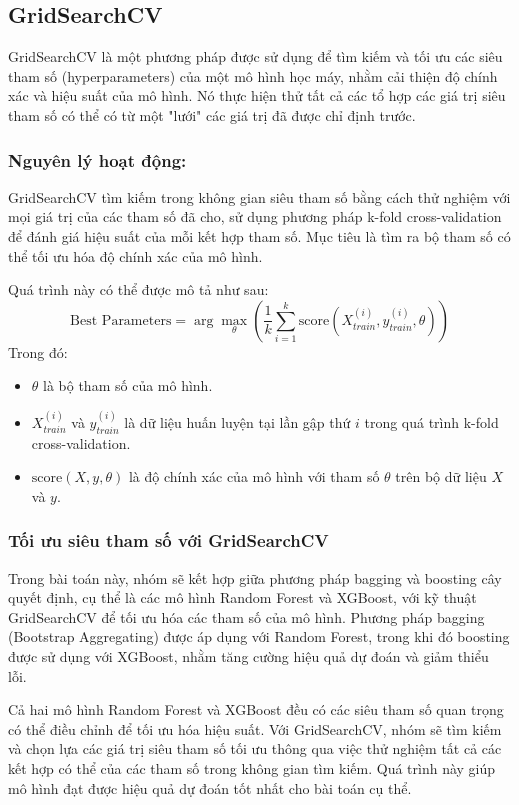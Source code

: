 \subsection{GridSearchCV} 
GridSearchCV là một phương pháp được sử dụng để tìm kiếm và tối ưu các siêu tham số (hyperparameters) của một mô hình học máy, nhằm cải thiện độ chính xác và hiệu suất của mô hình. Nó thực hiện thử tất cả các tổ hợp các giá trị siêu tham số có thể có từ một "lưới" các giá trị đã được chỉ định trước.

\subsubsection*{Nguyên lý hoạt động:}
GridSearchCV tìm kiếm trong không gian siêu tham số bằng cách thử nghiệm với mọi giá trị của các tham số đã cho, sử dụng phương pháp k-fold cross-validation để đánh giá hiệu suất của mỗi kết hợp tham số. Mục tiêu là tìm ra bộ tham số có thể tối ưu hóa độ chính xác của mô hình.

Quá trình này có thể được mô tả như sau:
\[
\text{Best Parameters} = \arg \max_{\theta} \left( \frac{1}{k} \sum_{i=1}^{k} \text{score}(X_{train}^{(i)}, y_{train}^{(i)}, \theta) \right)
\]
Trong đó:
\begin{itemize}
	\item \( \theta \) là bộ tham số của mô hình.
	\item \( X_{train}^{(i)} \) và \( y_{train}^{(i)} \) là dữ liệu huấn luyện tại lần gập thứ \(i\) trong quá trình k-fold cross-validation.
	\item \(\text{score}(X, y, \theta)\) là độ chính xác của mô hình với tham số \(\theta\) trên bộ dữ liệu \(X\) và \(y\).
\end{itemize}
\subsubsection*{Tối ưu siêu tham số với GridSearchCV}
Trong bài toán này, nhóm sẽ kết hợp giữa phương pháp bagging và boosting cây quyết định, cụ thể là các mô hình Random Forest và XGBoost, với kỹ thuật GridSearchCV để tối ưu hóa các tham số của mô hình. Phương pháp bagging (Bootstrap Aggregating) được áp dụng với Random Forest, trong khi đó boosting được sử dụng với XGBoost, nhằm tăng cường hiệu quả dự đoán và giảm thiểu lỗi.

Cả hai mô hình Random Forest và XGBoost đều có các siêu tham số quan trọng có thể điều chỉnh để tối ưu hóa hiệu suất. Với GridSearchCV, nhóm sẽ tìm kiếm và chọn lựa các giá trị siêu tham số tối ưu thông qua việc thử nghiệm tất cả các kết hợp có thể của các tham số trong không gian tìm kiếm. Quá trình này giúp mô hình đạt được hiệu quả dự đoán tốt nhất cho bài toán cụ thể.

